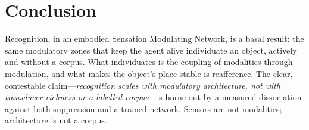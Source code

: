 \documentclass[11pt]{article}
\begin{document}
\section{Conclusion}

Recognition, in an embodied Sensation Modulating Network, is a basal result: the
same modulatory zones that keep the agent alive individuate an object, actively
and without a corpus. What individuates is the coupling of modalities through
modulation, and what makes the object's place stable is reafference. The clear,
contestable claim---\emph{recognition scales with modulatory architecture, not
with transducer richness or a labelled corpus}---is borne out by a measured
dissociation against both suppression and a trained network. Sensors are not
modalities; architecture is not a corpus.



\end{document}
